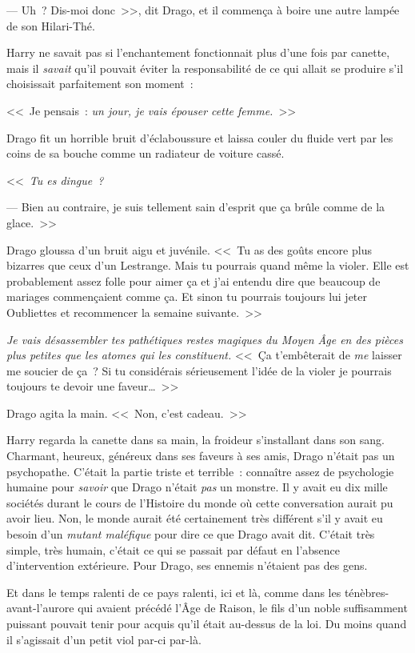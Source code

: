 --- Uh~? Dis-moi donc~>>, dit Drago, et il commença à boire une autre lampée de son Hilari-Thé.

Harry ne savait pas si l'enchantement fonctionnait plus d'une fois par canette, mais il \emph{savait} qu'il pouvait éviter la responsabilité de ce qui allait se produire s'il choisissait parfaitement son moment~:

<<~Je pensais~: \emph{un jour, je vais épouser cette femme.}~>>

Drago fit un horrible bruit d'éclaboussure et laissa couler du fluide vert par les coins de sa bouche comme un radiateur de voiture cassé.

<<~\emph{Tu es dingue~?}

--- Bien au contraire, je suis tellement sain d'esprit que ça brûle comme de la glace.~>>

Drago gloussa d'un bruit aigu et juvénile. <<~Tu as des goûts encore plus bizarres que ceux d'un Lestrange. Mais tu pourrais quand même la violer. Elle est probablement assez folle pour aimer ça et j'ai entendu dire que beaucoup de mariages commençaient comme ça. Et sinon tu pourrais toujours lui jeter Oubliettes et recommencer la semaine suivante.~>>

\emph{Je vais désassembler tes pathétiques restes magiques du Moyen Âge en des pièces plus petites que les atomes qui les constituent.} <<~Ça t'embêterait de \emph{me} laisser me soucier de ça~? Si tu considérais sérieusement l'idée de la violer je pourrais toujours te devoir une faveur…~>>

Drago agita la main. <<~Non, c'est cadeau.~>>

Harry regarda la canette dans sa main, la froideur s'installant dans son sang. Charmant, heureux, généreux dans ses faveurs à ses amis, Drago n'était pas un psychopathe. C'était la partie triste et terrible~: connaître assez de psychologie humaine pour \emph{savoir} que Drago n'était \emph{pas} un monstre. Il y avait eu dix mille sociétés durant le cours de l'Histoire du monde où cette conversation aurait pu avoir lieu. Non, le monde aurait été certainement très différent s'il y avait eu besoin d'un \emph{mutant maléfique} pour dire ce que Drago avait dit. C'était très simple, très humain, c'était ce qui se passait par défaut en l'absence d'intervention extérieure. Pour Drago, ses ennemis n'étaient pas des gens.

Et dans le temps ralenti de ce pays ralenti, ici et là, comme dans les ténèbres-avant-l'aurore qui avaient précédé l'Âge de Raison, le fils d'un noble suffisamment puissant pouvait tenir pour acquis qu'il était au-dessus de la loi. Du moins quand il s'agissait d'un petit viol par-ci par-là.

